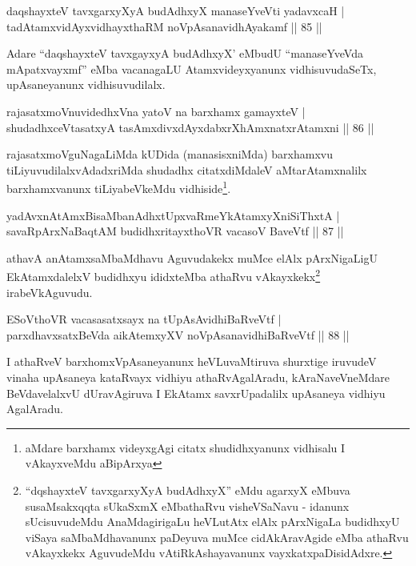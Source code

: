 \begin{shl}
daqshayxteV tavxgarxyXyA budAdhxyX manaseYveVti yadavxcaH |\\
tadAtamxvidAyxvidhayxthaRM noVpAsanavidhAyakamf \hfill || 85 ||
\end{shl}

\begin{artha}
Adare ``daqshayxteV tavxgayxyA budAdhxyX' eMbudU ``manaseYveVda mApatxvayxmf'' eMba vacanagaLU Atamxvideyxyanunx vidhisuvudaSeTx, upAsaneyanunx vidhisuvudilalx.
\end{artha}

\begin{shl}
rajasatxmoVnuvidedhxVna yatoV na barxhamx gamayxteV |\\
shudadhxceVtasatxyA tasAmxdivxdAyxdabxrXhAmxnatxrAtamxni \hfill || 86 ||
\end{shl}

\begin{artha}
rajasatxmoVguNagaLiMda kUDida (manasisxniMda) barxhamxvu tiLiyuvudilalxvAdadxriMda shudadhx citatxdiMdaleV aMtarAtamxnalilx barxhamxvanunx tiLiyabeVkeMdu  vidhiside\footnote{aMdare barxhamx   videyxgAgi citatx shudidhxyanunx vidhisalu I vAkayxveMdu aBipArxya}.
\end{artha}

\begin{shl}
yadAvx\s nAtAmxBisaMbanAdhxtUpxvaRmeYkAtamxyXniSiThxtA |\\
savaRpArxNaBaqtAM budidhxritayxthoVR vacasoV BaveVtf \hfill || 87 ||
\end{shl}

\begin{artha}
athavA anAtamxsaMbaMdhavu Aguvudakekx muMce elAlx pArxNigaLigU
EkAtamxdalelxV budidhxyu ididxteMba athaRvu
vAkayxkekx\footnote{``dqshayxteV tavxgarxyXyA budAdhxyX'' eMdu agarxyX eMbuva susaMsakxqqta
  sUkaSxmX eMbathaRvu visheVSaNavu - idanunx sUcisuvudeMdu
  AnaMdagirigaLu heVLutAtx elAlx pArxNigaLa budidhxyU viSaya
  saMbaMdhavanunx paDeyuva muMce cidAkAravAgide eMba athaRvu
  vAkayxkekx AguvudeMdu vAtiRkAshayavanunx vayxkatxpaDisidAdxre.} irabeVkAguvudu.
\end{artha}

\begin{shl}
ESoV\s thoVR vacasasatxsayx na tUpAsAvidhiBaRveVtf |\\
parxdhavxsatxBeVda aikAtemxyXV noVpAsanavidhiBaRveVtf \hfill || 88 ||
\end{shl}

\begin{artha}
I athaRveV barxhomxVpAsaneyanunx heVLuvaMtiruva shurxtige iruvudeV vinaha upAsaneya kataRvayx vidhiyu athaRvAgalAradu, kAraNaveVneMdare BeVdavelalxvU dUravAgiruva I EkAtamx savxrUpadalilx upAsaneya vidhiyu AgalAradu.
\end{artha}

